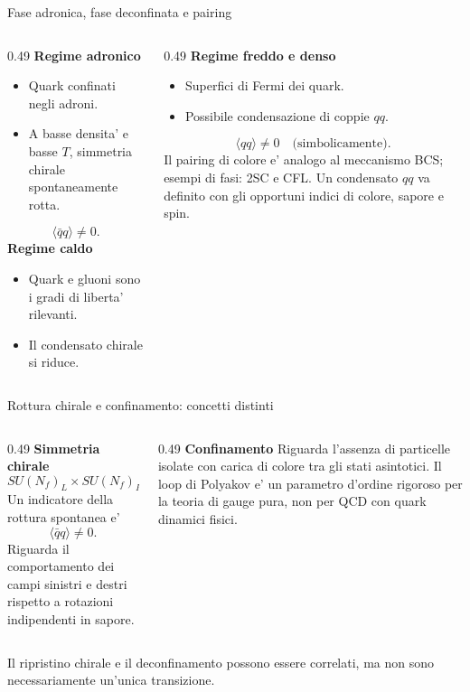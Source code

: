 \begin{frame}{Fase adronica, fase deconfinata e pairing}
\small
\begin{columns}[T,onlytextwidth]
\begin{column}{0.49\textwidth}
\textbf{Regime adronico}
\begin{itemize}
\item Quark confinati negli adroni.
\item A basse densita' e basse $T$, simmetria chirale spontaneamente rotta.
\end{itemize}
\[
\langle\bar q q\rangle\ne0.
\]
\textbf{Regime caldo}
\begin{itemize}
\item Quark e gluoni sono i gradi di liberta' rilevanti.
\item Il condensato chirale si riduce.
\end{itemize}
\end{column}
\begin{column}{0.49\textwidth}
\textbf{Regime freddo e denso}
\begin{itemize}
\item Superfici di Fermi dei quark.
\item Possibile condensazione di coppie $qq$.
\end{itemize}
\[
\langle qq\rangle\ne0
\quad\text{(simbolicamente)}.
\]
Il pairing di colore e' analogo al meccanismo BCS; esempi di fasi: 2SC e CFL.
\medskip
Un condensato $qq$ va definito con gli opportuni indici di colore, sapore e spin.
\end{column}
\end{columns}
\end{frame}

\begin{frame}{Rottura chirale e confinamento: concetti distinti}
\small
\begin{columns}[T,onlytextwidth]
\begin{column}{0.49\textwidth}
\textbf{Simmetria chirale}
\[
SU(N_f)_L\times SU(N_f)_R.
\]
Un indicatore della rottura spontanea e'
\[
\langle\bar q q\rangle\ne0.
\]
Riguarda il comportamento dei campi sinistri e destri rispetto a rotazioni indipendenti in sapore.
\end{column}
\begin{column}{0.49\textwidth}
\textbf{Confinamento}
\medskip
Riguarda l'assenza di particelle isolate con carica di colore tra gli stati asintotici.
\medskip
Il loop di Polyakov e' un parametro d'ordine rigoroso per la teoria di gauge pura, non per QCD con quark dinamici fisici.
\end{column}
\end{columns}
\medskip
Il ripristino chirale e il deconfinamento possono essere correlati,
ma non sono necessariamente un'unica transizione.
\end{frame}


